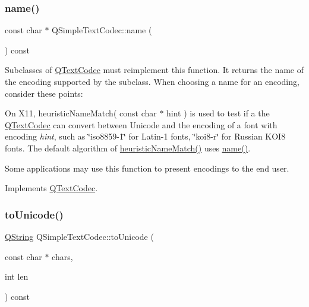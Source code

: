 \mbox{\label{class_q_simple_text_codec_a4e7462d95d59b6262f201d79a392bde9}} 
\subsubsection{\texorpdfstring{name()}{name()}}
{\footnotesize\ttfamily const char $\ast$ Q\+Simple\+Text\+Codec\+::name (\begin{DoxyParamCaption}{ }\end{DoxyParamCaption}) const\hspace{0.3cm}{\ttfamily [virtual]}}

Subclasses of \mbox{\hyperlink{class_q_text_codec}{Q\+Text\+Codec}} must reimplement this function. It returns the name of the encoding supported by the subclass. When choosing a name for an encoding, consider these points\+: 
\begin{DoxyItemize}
\item On X11, heuristic\+Name\+Match( const char $\ast$ hint ) is used to test if a the \mbox{\hyperlink{class_q_text_codec}{Q\+Text\+Codec}} can convert between Unicode and the encoding of a font with encoding {\itshape hint}, such as \char`\"{}iso8859-\/1\char`\"{} for Latin-\/1 fonts, \char`\"{}koi8-\/r\char`\"{} for Russian K\+O\+I8 fonts. The default algorithm of \mbox{\hyperlink{class_q_simple_text_codec_ab08ae2e5e99af1cd6dda3450731e502b}{heuristic\+Name\+Match()}} uses \mbox{\hyperlink{class_q_simple_text_codec_a4e7462d95d59b6262f201d79a392bde9}{name()}}. 
\item Some applications may use this function to present encodings to the end user. 
\end{DoxyItemize}

Implements \mbox{\hyperlink{class_q_text_codec_a5b735ce19dc6b0fb0e8858bd3f54f0e2}{Q\+Text\+Codec}}.

\mbox{\label{class_q_simple_text_codec_a750180ddce19925a1b7314423b84a612}} 
\subsubsection{\texorpdfstring{toUnicode()}{toUnicode()}}
{\footnotesize\ttfamily \mbox{\hyperlink{class_q_string}{Q\+String}} Q\+Simple\+Text\+Codec\+::to\+Unicode (\begin{DoxyParamCaption}\item[{const char $\ast$}]{chars,  }\item[{int}]{len }\end{DoxyParamCaption}) const\hspace{0.3cm}{\ttfamily [virtual]}}

